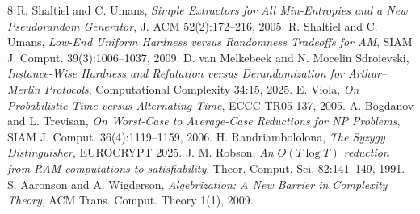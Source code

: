 \documentclass[11pt]{article}
\begin{document}
\begin{thebibliography}{8}
 R. Shaltiel and C. Umans, \emph{Simple Extractors for All Min-Entropies and a New Pseudorandom Generator}, J. ACM 52(2):172--216, 2005.
 R. Shaltiel and C. Umans, \emph{Low-End Uniform Hardness versus Randomness Tradeoffs for AM}, SIAM J. Comput. 39(3):1006--1037, 2009.
 D. van Melkebeek and N. Mocelin Sdroievski, \emph{Instance-Wise Hardness and Refutation versus Derandomization for Arthur--Merlin Protocols}, Computational Complexity 34:15, 2025.
 E. Viola, \emph{On Probabilistic Time versus Alternating Time}, ECCC TR05-137, 2005.
 A. Bogdanov and L. Trevisan, \emph{On Worst-Case to Average-Case Reductions for NP Problems}, SIAM J. Comput. 36(4):1119--1159, 2006.
 H. Randriambololona, \emph{The Syzygy Distinguisher}, EUROCRYPT 2025.
 J. M. Robson, \emph{An \(O(T\log T)\) reduction from RAM computations to satisfiability}, Theor. Comput. Sci. 82:141--149, 1991.
 S. Aaronson and A. Wigderson, \emph{Algebrization: A New Barrier in Complexity Theory}, ACM Trans. Comput. Theory 1(1), 2009.
\end{thebibliography}
\end{document}
